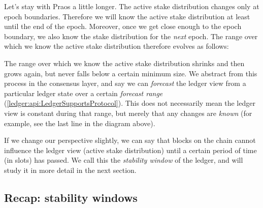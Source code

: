 Let's stay with Praos a little longer. The active stake distribution changes
only at epoch boundaries. Therefore we will know the active stake distribution
at least until the end of the epoch.  Moreover, once we get close enough to the
epoch boundary, we also know the stake distribution for the \emph{next} epoch.
The range over which we know the active stake distribution therefore evolves as
follows:
%
\begin{center}
\end{center}

\pagebreak

The range over which we know the active stake distribution shrinks and then
grows again, but never falls below a certain minimum size. We abstract from this
process in the consensus layer, and say we can \emph{forecast} the ledger view
from a particular ledger state over a certain \emph{forecast range}
(\cref{ledger:api:LedgerSupportsProtocol}). This does not necessarily mean the
ledger view is constant during that range, but merely that any changes are
\emph{known} (for example, see the last line in the diagram above).

If we change our perspective slightly, we can say that blocks on the chain
cannot influence the ledger view (active stake distribution) until a certain
period of time (in slots) has passed. We call this the \emph{stability window}
of the ledger, and will study it in more detail in the next section.

\subsection{Recap: stability windows}
\label{low-density:recap-stability-window}


